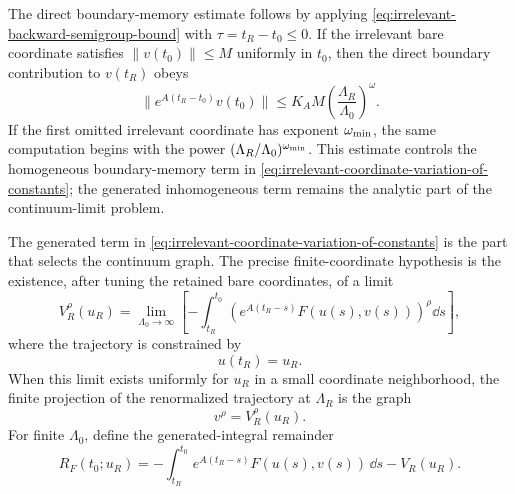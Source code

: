 The direct boundary-memory estimate follows by applying
\eqref{eq:irrelevant-backward-semigroup-bound} with \(\tau=t_R-t_0\leq0\).
If the irrelevant bare coordinate satisfies \(\|v(t_0)\|\leq M\) uniformly in
\(t_0\), then the direct boundary contribution to \(v(t_R)\) obeys
\[
  \|e^{A(t_R-t_0)}v(t_0)\|
  \leq
  K_A M
  \left(\frac{\Lambda_R}{\Lambda_0}\right)^\omega .
\]
If the first omitted irrelevant coordinate has exponent \(\omega_{\rm min}\),
the same computation begins with the power
\((\Lambda_R/\Lambda_0)^{\omega_{\rm min}}\).  This estimate controls the
homogeneous boundary-memory term in
\eqref{eq:irrelevant-coordinate-variation-of-constants}; the generated
inhomogeneous term remains the analytic part of the continuum-limit problem.

The generated term in
\eqref{eq:irrelevant-coordinate-variation-of-constants} is the part that
selects the continuum graph.  The precise finite-coordinate hypothesis is the
existence, after tuning the retained bare coordinates, of a limit
\begin{equation}
  V^\rho_R(u_R)
  =
  \lim_{\Lambda_0\to\infty}
  \left[
    -
    \int_{t_R}^{t_0}
    \left(e^{A(t_R-s)}F(u(s),v(s))\right)^\rho
    \dd s
  \right],
  \label{eq:continuum-graph-generated-irrelevant-coordinate}
\end{equation}
where the trajectory is constrained by
\[
  u(t_R)=u_R .
\]
When this limit exists uniformly for \(u_R\) in a small coordinate
neighborhood, the finite projection of the renormalized trajectory at
\(\Lambda_R\) is the graph
\[
  v^\rho=V^\rho_R(u_R).
\]
For finite \(\Lambda_0\), define the generated-integral remainder
\[
  R_F(t_0;u_R)
  =
  -
  \int_{t_R}^{t_0}
  e^{A(t_R-s)}F(u(s),v(s))\,\dd s
  -
  V_R(u_R).
\]

